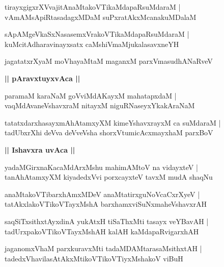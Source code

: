 \documentclass[twoside,12pt,openright]{book}
\newcounter{shloka}[chapter]
\def\uvaca#1{\centerline{{\large\textbf{#1}}}}
\begin{document}
\begin{shloka}%
tirayxgigxrXVvajitAnaMtakoVTikaMdapaRsuMdaraM |\\
vAmAMsApiRtasadagxMDaM suPxratAkxMcanakuMDalaM 
\end{shloka}

\begin{shloka}%
sApAMgeVkaSxNasasemxVrakoVTikaMdapaRsuMdaraM |\\
kuMcitAdharavinayxsatx caMshiVmaMjukalasavxneYH
\end{shloka}

\begin{shloka}%
jagatatxrXyaM moVhayaMtaM maganxM parxVmasudhANaRveV
\end{shloka}

\uvaca{|| pAravxtuyxvAca ||}

\begin{shloka}%
paramaM karaNaM goVviMdAKayxM mahatapxdaM |\\
vaqMdAvaneVshavxraM nitayxM niguRNaseyxYkakAraNaM 
\end{shloka}

\begin{shloka}%
tatatxdarxhasayxmAhAtamxyXM kimeYshavxrayxM ca suMdaraM |\\
tadUbxrXhi deVva deVveVsha shorxVtumicAcxmayxhaM parxBoV 
\end{shloka}

\uvaca{|| Ishavxra uvAca ||}

\begin{shloka}%
yadaMGirxnaKacaMdArxMshu mahimAMtoV na vidayxteV |\\
tanAhAtamxyXM kiyadedxVvi porxcayxteV tavxM mudA shaqNu
\end{shloka}

\begin{shloka}%
anaMtakoVTibarxhAmxMDeV anaMtatirxguNoVcaCxrXyeV |\\
tatAkxlakoVTikoVTayxMshA barxhamxviSuNxmaheVshavxrAH 
\end{shloka}

\begin{shloka}%
saqSiTxsithxtAyxdinA yukAtxH tiSaThxMti tasayx veYBavAH |\\
tadUrxpakoVTikoVTayxMshAH kalAH kaMdapaRvigarxhAH 
\end{shloka}

\begin{shloka}%
jaganomxVhaM parxkuravxMti tadaMDAMtarasaMsithxtAH |\\
tadedxVhavilasAtAkxMtikoVTikoVTiyxMshakoV viBuH 
\end{shloka}
\end{document}
